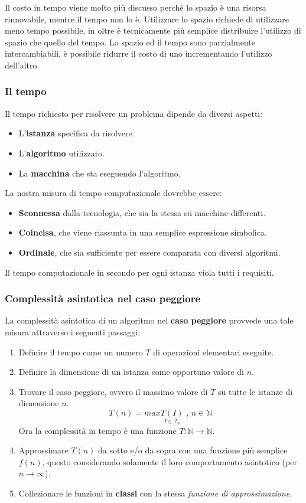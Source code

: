 \documentclass{article}
\begin{document}
Il costo in tempo viene molto più discusso perché lo spazio è una risorsa rinnovabile, mentre il tempo non lo è.
Utilizzare lo spazio richiede di utilizzare meno tempo possibile, in oltre è tecnicamente più semplice distribuire
l'utilizzo di spazio che quello del tempo. Lo spazio ed il tempo sono parzialmente intercambiabili,
è possibile ridurre il costo di uno incrementando l'utilizzo dell'altro.

\subsubsection{Il tempo}
Il tempo richiesto per risolvere un problema dipende da diversi aspetti:
\begin{itemize}
    \item L'\textbf{istanza} specifica da risolvere.
    \item L'\textbf{algoritmo} utilizzato.
    \item La \textbf{macchina} che sta eseguendo l'algoritmo.
\end{itemize}
La nostra misura di tempo computazionale dovrebbe essere:
\begin{itemize}
    \item \textbf{Sconnessa} dalla tecnologia, che sia la stessa su macchine differenti.
    \item \textbf{Coincisa}, che viene riassunta in una semplice espressione simbolica.
    \item \textbf{Ordinale}, che sia sufficiente per essere comparata con diversi algoritmi.
\end{itemize}
Il tempo computazionale in secondo per ogni istanza viola tutti i requisiti.

\subsubsection{Complessità asintotica nel caso peggiore}
La complessità asintotica di un algoritmo nel \textbf{caso peggiore} provvede una tale misura
attraverso i seguenti passaggi:
\begin{enumerate}
    \item Definire il tempo come un numero $T$ di operazioni elementari eseguite.
    \item Definire la dimensione di un istanza come opportuno valore di $n$.
    \item Trovare il caso peggiore, ovvero il massimo valore di $T$ su tutte le istanze
          di dimensione $n$. $$T(n)=max\underset{I\in\mathcal{I}_n}{T(I)}\text{  ,  }n\in\mathbb{N}$$
          Ora la complessità in tempo è una funzione $T:\mathbb{N}\rightarrow\mathbb{N}$.
    \item Approssimare $T(n)$ da sotto e/o da sopra con una funzione più semplice $f(n)$, questo
          considerando solamente il loro comportamento asintotico (per $n\rightarrow\infty$).
    \item Collezionare le funzioni in \textbf{classi} con la stessa \textit{funzione di approssimazione}.
\end{enumerate}
\end{document}
